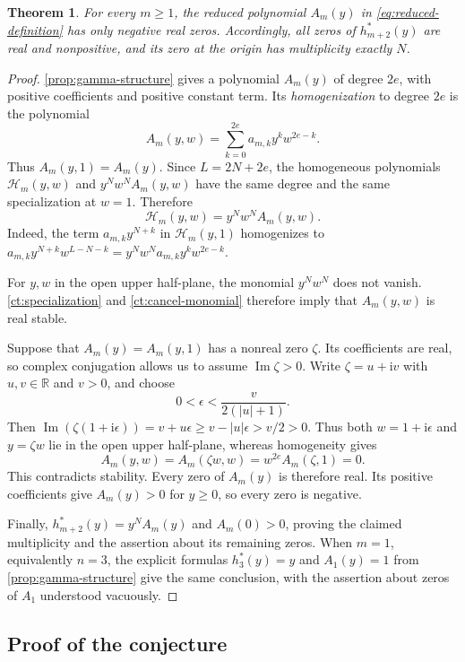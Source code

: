 \documentclass[reqno, 12pt]{article}
\numberwithin{equation}{section}
\newtheorem{theorem}{Theorem}[section]
\theoremstyle{definition}
\begin{document}
\begin{theorem}\label{ct:negative-roots}
For every $m\geq1$, the reduced polynomial $A_m(y)$ in
\eqref{eq:reduced-definition} has only negative real zeros.  Accordingly, all zeros of $h_{m+2}^*(y)$ are real and nonpositive, and its zero at the origin has multiplicity exactly $N$.
\end{theorem}
\begin{proof}
\cref{prop:gamma-structure} gives a polynomial
$A_m(y)$ of degree
$2e$, with positive coefficients and positive constant term.
Its \emph{homogenization} to degree $2e$ is the polynomial
\[
 A_m(y,w)=\sum_{k=0}^{2e}a_{m,k}y^kw^{2e-k}.
\]
Thus $A_m(y,1)=A_m(y)$.  Since $L=2N+2e$, the homogeneous
polynomials $\mathcal H_m(y,w)$ and $y^Nw^NA_m(y,w)$ have the
same degree and the same specialization at $w=1$.  Therefore
\begin{equation}\label{ct:cancel-monomial}
 \mathcal H_m(y,w)=y^Nw^NA_m(y,w).
\end{equation}
Indeed, the term $a_{m,k}y^{N+k}$ in $\mathcal H_m(y,1)$
homogenizes to
$a_{m,k}y^{N+k}w^{L-N-k}=y^Nw^Na_{m,k}y^kw^{2e-k}$.

For $y,w$ in the open upper half-plane, the monomial $y^Nw^N$
does not vanish. \cref{ct:specialization} and
\eqref{ct:cancel-monomial} therefore imply that $A_m(y,w)$
is real stable.

Suppose that $A_m(y)=A_m(y,1)$ has a nonreal zero $\zeta$.
Its coefficients are real, so complex conjugation allows us to
assume $\operatorname{Im}\zeta>0$.  Write
$\zeta=u+\mathrm iv$ with $u,v\in\mathbb R$ and $v>0$,
and choose
\[
 0<\epsilon<\frac{v}{2(|u|+1)}.
\]
Then
$\operatorname{Im}(\zeta(1+\mathrm i\epsilon))
 =v+u\epsilon\geq v-|u|\epsilon>v/2>0$.
Thus both
$w=1+\mathrm i\epsilon$ and $y=\zeta w$ lie in the open upper
half-plane, whereas homogeneity gives
\[
A_m(y,w)=A_m(\zeta w,w)=w^{2e}A_m(\zeta,1)=0.
\]
This contradicts stability.  Every zero of $A_m(y)$ is therefore
real.  Its positive coefficients give $A_m(y)>0$ for $y\geq0$, so every zero is negative.

Finally, $h_{m+2}^*(y)=y^NA_m(y)$ and $A_m(0)>0$, proving the
claimed multiplicity and the assertion about its remaining
zeros.  When $m=1$, equivalently $n=3$, the explicit formulas
$h_3^*(y)=y$ and $A_1(y)=1$ from \cref{prop:gamma-structure}
give the same conclusion, with the assertion about zeros of
$A_1$ understood vacuously.
\end{proof}


\subsection{Proof of the conjecture}\label{sec:newton}
\end{document}
